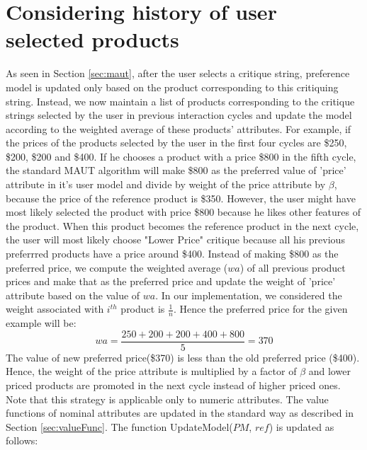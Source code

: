 \section{Considering history of user selected products}
As seen in Section \ref{sec:maut}, after the user selects a critique string, preference model is updated only based on the product corresponding to this critiquing string.
Instead, we now maintain a list of products corresponding to the critique strings selected by the user in previous interaction cycles and update the model according to the weighted average of these products' attributes.
For example, if the prices of the products selected by the user in the first four cycles are \$250, \$200, \$200 and \$400.
If he chooses a product with a price \$800 in the fifth cycle, the standard MAUT algorithm will make \$800 as the preferred value of 'price' attribute in it's user model and divide by weight of the price attribute by $\beta$, because the price of the reference product is \$350.
However, the user might have most likely selected the product with price \$800 because he likes other features of the product.
When this product becomes the reference product in the next cycle, the user will most likely choose "Lower Price" critique because all his previous preferrred products have a price around \$400.
Instead of making \$800 as the preferred price, we compute the weighted average ($wa$) of all previous product prices and make that as the preferred price and update the weight of 'price' attribute based on the value of $wa$.
In our implementation, we considered the weight associated with $i^{th}$ product is $\frac{1}{n}$. 
Hence the preferred price for the given example will be:
\begin{equation}
wa = \frac{250+200+200+400+800} {5} = 370
\end{equation}
The value of new preferred price(\$370) is less than the old preferred price (\$400).
Hence, the weight of the price attribute is multiplied by a factor of $\beta$ and lower priced products are promoted in the next cycle instead of higher priced ones.
Note that this strategy is applicable only to numeric attributes.
The value functions of nominal attributes are updated in the standard way as described in Section \ref{sec:valueFunc}.
The function UpdateModel($PM$, $ref$) is updated as follows:


